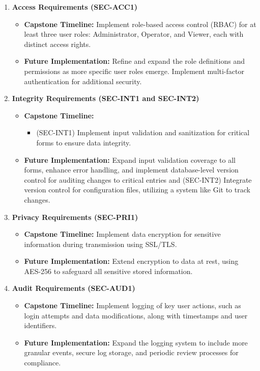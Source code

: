 \documentclass{article}
\begin{document}
\begin{enumerate}
    \item \textbf{Access Requirements (SEC-ACC1)}
    \begin{itemize}
        \item \textbf{Capstone Timeline:} Implement role-based access control (RBAC) for at least three user roles: Administrator, Operator, and Viewer, each with distinct access rights.
        \item \textbf{Future Implementation:} Refine and expand the role definitions and permissions as more specific user roles emerge. Implement multi-factor authentication for additional security.
    \end{itemize}

    \item \textbf{Integrity Requirements (SEC-INT1 and SEC-INT2)}
    \begin{itemize}
        \item \textbf{Capstone Timeline:} 
        \begin{itemize}
            \item (SEC-INT1) Implement input validation and sanitization for critical forms to ensure data integrity.
   
        \end{itemize}
        \item \textbf{Future Implementation:} Expand input validation coverage to all forms, enhance error handling, and implement database-level version control for auditing changes to critical entries and (SEC-INT2) Integrate version control for configuration files, utilizing a system like Git to track changes.
                
    \end{itemize}

    \item \textbf{Privacy Requirements (SEC-PRI1)}
    \begin{itemize}
        \item \textbf{Capstone Timeline:} Implement data encryption for sensitive information during transmission using SSL/TLS.
        \item \textbf{Future Implementation:} Extend encryption to data at rest, using AES-256 to safeguard all sensitive stored information.
    \end{itemize}

    \item \textbf{Audit Requirements (SEC-AUD1)}
    \begin{itemize}
        \item \textbf{Capstone Timeline:} Implement logging of key user actions, such as login attempts and data modifications, along with timestamps and user identifiers.
        \item \textbf{Future Implementation:} Expand the logging system to include more granular events, secure log storage, and periodic review processes for compliance.
    \end{itemize}


\end{enumerate}
\end{document}

